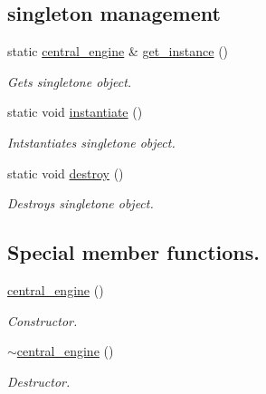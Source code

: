 \subsection*{singleton management}
\begin{DoxyCompactItemize}
\item 
\hypertarget{classcentral__engine_a852875ee7b8279803b4c43d5988f51b0}{static \hyperlink{classcentral__engine}{central\-\_\-engine} \& \hyperlink{classcentral__engine_a852875ee7b8279803b4c43d5988f51b0}{get\-\_\-instance} ()}\label{classcentral__engine_a852875ee7b8279803b4c43d5988f51b0}

\begin{DoxyCompactList}\small\item\em Gets singletone object. \end{DoxyCompactList}\item 
\hypertarget{classcentral__engine_a44a4aa7379eb48e7dfb11909c361d740}{static void \hyperlink{classcentral__engine_a44a4aa7379eb48e7dfb11909c361d740}{instantiate} ()}\label{classcentral__engine_a44a4aa7379eb48e7dfb11909c361d740}

\begin{DoxyCompactList}\small\item\em Intstantiates singletone object. \end{DoxyCompactList}\item 
\hypertarget{classcentral__engine_ae8401a3e9da3b1ba124c4113b0f3fc02}{static void \hyperlink{classcentral__engine_ae8401a3e9da3b1ba124c4113b0f3fc02}{destroy} ()}\label{classcentral__engine_ae8401a3e9da3b1ba124c4113b0f3fc02}

\begin{DoxyCompactList}\small\item\em Destroys singletone object. \end{DoxyCompactList}\end{DoxyCompactItemize}
\subsection*{Special member functions.}
\begin{DoxyCompactItemize}
\item 
\hypertarget{classcentral__engine_a64c491c757e264a13d561421171c76bb}{\hyperlink{classcentral__engine_a64c491c757e264a13d561421171c76bb}{central\-\_\-engine} ()}\label{classcentral__engine_a64c491c757e264a13d561421171c76bb}

\begin{DoxyCompactList}\small\item\em Constructor. \end{DoxyCompactList}\item 
\hypertarget{classcentral__engine_a8dcca4e3b04a1f43b726b6fe79ee401f}{\hyperlink{classcentral__engine_a8dcca4e3b04a1f43b726b6fe79ee401f}{$\sim$central\-\_\-engine} ()}\label{classcentral__engine_a8dcca4e3b04a1f43b726b6fe79ee401f}

\begin{DoxyCompactList}\small\item\em Destructor. \end{DoxyCompactList}\end{DoxyCompactItemize}


